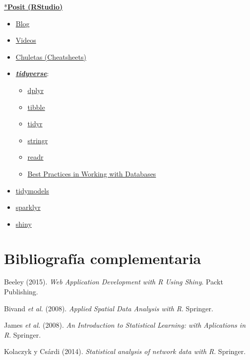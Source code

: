 \documentclass[
]{book}
\theoremstyle{break}
\theoremstyle{nonumberplain}
\begin{document}
\href{https://posit.co}{*\textbf{Posit (RStudio)}}

\begin{itemize}
\item
  \href{https://posit.co/blog}{Blog}
\item
  \href{https://posit.co/resources/videos}{Videos}
\item
  \href{https://posit.co/resources/cheatsheets}{Chuletas (Cheatsheets)}
\item
  \href{https://www.tidyverse.org/}{\textbf{\emph{tidyverse}}}:

  \begin{itemize}
  \item
    \href{https://dplyr.tidyverse.org}{dplyr}
  \item
    \href{https://tibble.tidyverse.org}{tibble}
  \item
    \href{https://tidyr.tidyverse.org}{tidyr}
  \item
    \href{https://stringr.tidyverse.org}{stringr}
  \item
    \href{https://readr.tidyverse.org}{readr}
  \item
    \href{https://solutions.posit.co/connections/db}{Best Practices in Working with Databases}
  \end{itemize}
\item
  \href{https://www.tidymodels.org}{tidymodels}
\item
  \href{https://spark.rstudio.com/}{sparklyr}
\item
  \href{http://shiny.rstudio.com}{shiny}
\end{itemize}

\hypertarget{bibliografuxeda-complementaria}{%
\section*{Bibliografía complementaria}\label{bibliografuxeda-complementaria}}

Beeley (2015). \emph{Web Application Development with R Using Shiny}.
Packt Publishing.

Bivand \emph{et al.} (2008). \emph{Applied Spatial Data Analysis with R}. Springer.

James \emph{et al.} (2008). \emph{An Introduction to Statistical Learning: with
Aplications in R}. Springer.

Kolaczyk y Csárdi (2014). \emph{Statistical analysis of network data with R}. Springer.
\end{document}
